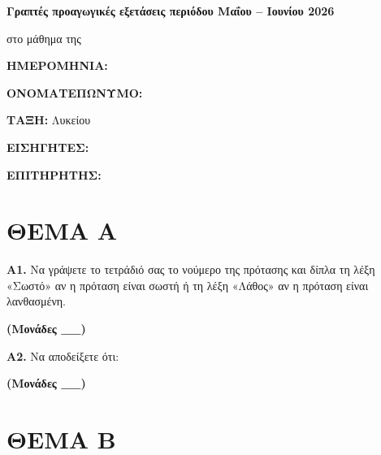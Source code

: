 \documentclass[12pt]{article}
\begin{document}
\begin{center}
{\Large \textbf{Γραπτές προαγωγικές εξετάσεις περιόδου Μαΐου – Ιουνίου 2026}}

\vspace{0.5cm}

στο μάθημα της \underline{\hspace{5cm}}

\end{center}

\vspace{1cm}

\textbf{ΗΜΕΡΟΜΗΝΙΑ:} \underline{\hspace{3cm}}

\vspace{0.3cm}

\textbf{ΟΝΟΜΑΤΕΠΩΝΥΜΟ:} \underline{\hspace{8cm}}

\vspace{0.3cm}

\textbf{ΤΑΞΗ:} \underline{\hspace{2cm}} Λυκείου

\vspace{0.3cm}

\textbf{ΕΙΣΗΓΗΤΕΣ:}

\vspace{0.3cm}

\textbf{ΕΠΙΤΗΡΗΤΗΣ:} \underline{\hspace{6cm}}

\vspace{1cm}

\section*{ΘΕΜΑ Α}

\textbf{Α1.} Να γράψετε το τετράδιό σας το νούμερο της πρότασης και δίπλα τη λέξη «Σωστό» αν η πρόταση είναι σωστή ή τη λέξη «Λάθος» αν η πρόταση είναι λανθασμένη.

\hfill \textbf{(Μονάδες __)}

\vspace{0.5cm}

\textbf{Α2.} Να αποδείξετε ότι:

\hfill \textbf{(Μονάδες __)}

\vspace{1cm}

\section*{ΘΕΜΑ Β}
\end{document}
